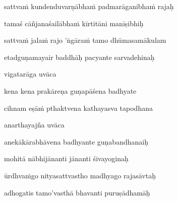 sattvaṁ kundenduvarṇābhaṁ padmarāganibhaṁ rajaḥ\thinspace{\dandab} \dontdisplaylinenum

tamaś cāñjanaśailābhaṁ kīrtitāni manīṣibhiḥ \veg\dontdisplaylinenum
{}

sattvaṁ jalaṁ rajo 'ṅgāraṁ tamo dhūmasamākulam\thinspace{\dandab} \dontdisplaylinenum

etadguṇamayair baddhāḥ pacyante sarvadehinaḥ \veg\dontdisplaylinenum
{}

vigatarāga uvāca~{\dandab}\dontdisplaylinenum 

kena kena prakāreṇa guṇapāśena badhyate\thinspace{\danda} \dontdisplaylinenum

cihnam eṣāṁ pthaktvena kathayasva tapodhana \veg\dontdisplaylinenum
{}

anarthayajña uvāca~{\dandab}\dontdisplaylinenum 

anekākārabhāvena badhyante guṇabandhanaiḥ\thinspace{\danda} \dontdisplaylinenum

mohitā nābhijānanti jānanti śivayoginaḥ \veg\dontdisplaylinenum
{}

ūrdhvaṁgo nityasattvastho madhyago rajasāvtaḥ\thinspace{\dandab} \dontdisplaylinenum

adhogatis tamo'vasthā bhavanti puruṣādhamāḥ \veg\dontdisplaylinenum
{}

